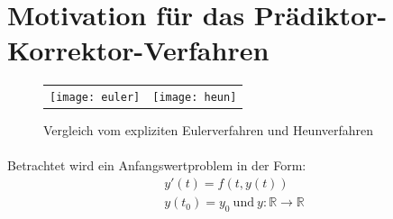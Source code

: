 \documentclass{listhesis}
\begin{document}
\section{Motivation für das Prädiktor-Korrektor-Verfahren} \label{section:PK}

\begin{figure}[!h]
\centering
\begin{tabular}{@{}cc@{}}
\texttt{[image: euler]}&
\texttt{[image: heun]}
\end{tabular}
\caption{Vergleich vom expliziten Eulerverfahren und Heunverfahren}
\label{fig:motivation}
\end{figure}

\paragraph{}
Betrachtet wird ein Anfangswertproblem in der Form:
\begin{gather*}
y'(t) = f(t,y(t))\\ y(t_0) = y_0\: \text{und}\: y:\mathbb{R}\rightarrow\mathbb{R}
\end{gather*}
\end{document}
